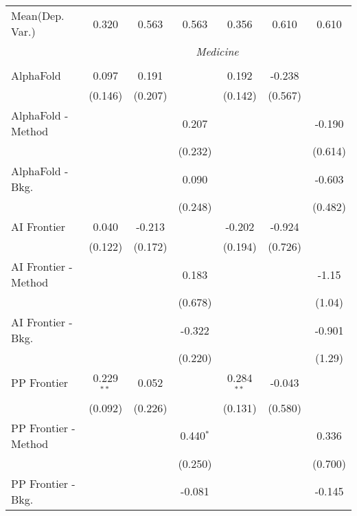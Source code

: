 \begin{tabular}{lcccccc}
Mean(Dep. Var.) & 0.320 & 0.563 & 0.563 & 0.356 & 0.610 & 0.610 \\
 & \multicolumn{6}{c}{\textit{Medicine}} \\ \\
   AlphaFold            & 0.097        & 0.191   &             & 0.192        & -0.238  &   \\   
                        & (0.146)      & (0.207) &             & (0.142)      & (0.567) &   \\   
   AlphaFold - Method   &              &         & 0.207       &              &         & -0.190\\   
                        &              &         & (0.232)     &              &         & (0.614)\\   
   AlphaFold - Bkg.     &              &         & 0.090       &              &         & -0.603\\   
                        &              &         & (0.248)     &              &         & (0.482)\\   
   AI Frontier          & 0.040        & -0.213  &             & -0.202       & -0.924  &   \\   
                        & (0.122)      & (0.172) &             & (0.194)      & (0.726) &   \\   
   AI Frontier - Method &              &         & 0.183       &              &         & -1.15\\   
                        &              &         & (0.678)     &              &         & (1.04)\\   
   AI Frontier - Bkg.   &              &         & -0.322      &              &         & -0.901\\   
                        &              &         & (0.220)     &              &         & (1.29)\\   
   PP Frontier          & 0.229$^{**}$ & 0.052   &             & 0.284$^{**}$ & -0.043  &   \\   
                        & (0.092)      & (0.226) &             & (0.131)      & (0.580) &   \\   
   PP Frontier - Method &              &         & 0.440$^{*}$ &              &         & 0.336\\   
                        &              &         & (0.250)     &              &         & (0.700)\\   
   PP Frontier - Bkg.   &              &         & -0.081      &              &         & -0.145\\   

\end{tabular}
